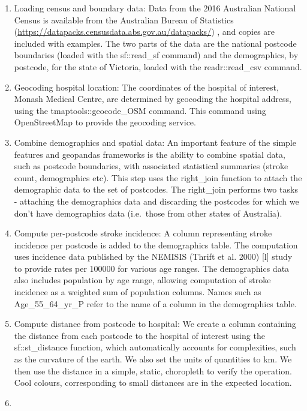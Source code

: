 \documentclass[]{article}
\begin{document}
\begin{enumerate}
\def\labelenumi{\arabic{enumi}.}
\item
  Loading census and boundary data: Data from the 2016 Australian
  National Census is available from the Australian Bureau of Statistics
  (\url{https://datapacks.censusdata.abs.gov.au/datapacks/}) , and
  copies are included with examples. The two parts of the data are the
  national postcode boundaries (loaded with the sf::read\_sf command)
  and the demographics, by postcode, for the state of Victoria, loaded
  with the readr::read\_csv command.
\item
  Geocoding hospital location: The coordinates of the hospital of
  interest, Monash Medical Centre, are determined by geocoding the
  hospital address, using the tmaptools::geocode\_OSM command. This
  command using OpenStreetMap to provide the geocoding service.
\item
  Combine demographics and spatial data: An important feature of the
  simple features and geopandas frameworks is the ability to combine
  spatial data, such as postcode boundaries, with associated statistical
  summaries (stroke count, demographics etc). This step uses the
  right\_join function to attach the demographic data to the set of
  postcodes. The right\_join performs two tasks - attaching the
  demographics data and discarding the postcodes for which we don't have
  demographics data (i.e.~those from other states of Australia).
\item
  Compute per-postcode stroke incidence: A column representing stroke
  incidence per postcode is added to the demographics table. The
  computation uses incidence data published by the NEMISIS (Thrift et
  al. 2000) {[}l{]} study to provide rates per 100000 for various age
  ranges. The demographics data also includes population by age range,
  allowing computation of stroke incidence as a weighted sum of
  population columns. Names such as Age\_55\_64\_yr\_P refer to the name
  of a column in the demographics table.
\item
  Compute distance from postcode to hospital: We create a column
  containing the distance from each postcode to the hospital of interest
  using the sf::st\_distance function, which automatically accounts for
  complexities, such as the curvature of the earth. We also set the
  units of quantities to km. We then use the distance in a simple,
  static, choropleth to verify the operation. Cool colours,
  corresponding to small distances are in the expected location.
\item

\end{enumerate}
\end{document}
